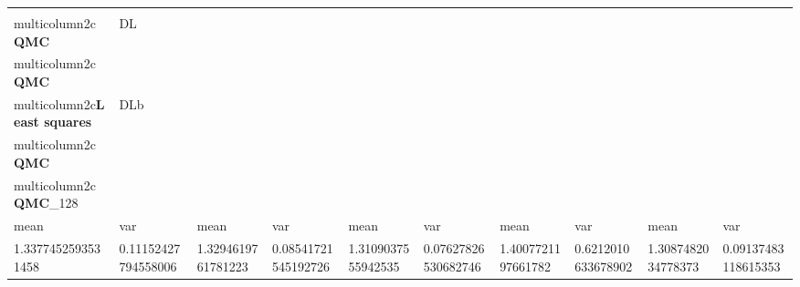 \begin{tabular}{llllllllll}
\toprule
 \\multicolumn{2}{c}{\textbf{QMC}}                & DL\\multicolumn{2}{c}{\textbf{QMC}}               & \\multicolumn{2}{c}{\textbf{Least squares}}      & DLb\\multicolumn{2}{c}{\textbf{QMC}}              & \\multicolumn{2}{c}{\textbf{QMC}}\_128            &                     &                    &                    &                    &                     \\
 mean               & var                 & mean               & var                 & mean               & var                 & mean               & var                & mean               & var                 \\
 1.3377452593531458 & 0.11152427794558006 & 1.3294619761781223 & 0.08541721545192726 & 1.3109037555942535 & 0.07627826530682746 & 1.4007721197661782 & 0.6212010633678902 & 1.3087482034778373 & 0.09137483118615353 \\
\bottomrule
\end{tabular}%
